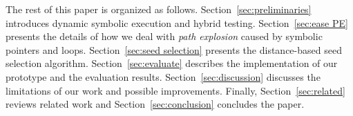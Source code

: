
The rest of this paper is organized as follows.
Section~\ref{sec:preliminaries} introduces dynamic symbolic execution
and hybrid testing. Section~\ref{sec:ease PE} presents the details of
how we deal with \textit{path explosion} caused by symbolic pointers
and loops. Section~\ref{sec:seed selection} presents the distance-based
seed selection algorithm. Section~\ref{sec:evaluate} describes the
implementation of our prototype and the evaluation results.
Section~\ref{sec:discussion} discusses the limitations of our work and
possible improvements. Finally, Section~\ref{sec:related} reviews
related work and Section~\ref{sec:conclusion} concludes the paper.
